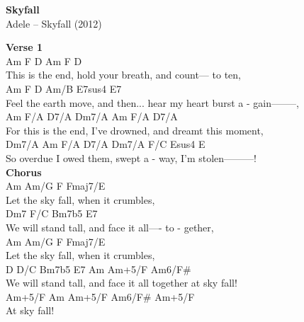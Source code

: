 \documentclass[a4paper]{article}
\begin{document}
    \begin{center}
        \textbf{Skyfall}
        ~\\
        Adele -- Skyfall (2012)
    \end{center}
    {
        \scriptsize
        \textbf{Verse 1}
        ~\\
        {
            \cutive
            \obeyspaces
     Am           F   D                         Am   F          D
\\
This is the end,         hold your breath, and count--- to ten,
\\
                Am        F     D                Am/B     E7sus4   E7
\\
Feel the earth move, and then...   hear my heart burst a - gain--------,
\\
         Am         F/A   D7/A        Dm7/A                    Am   F/A   D7/A
\\
For this is the end,            I've drowned, and dreamt this moment,
\\
    Dm7/A     Am  F/A   D7/A  Dm7/A      F/C       Esus4    E    
\\
So overdue I owed them,        swept a - way, I'm stolen---------!
\\

        }
        \textbf{Chorus}
        ~\\
        {
            \cutive
            \obeyspaces
         Am       Am/G       F      Fmaj7/E        
\\
Let the sky fall, when it crumbles,           
\\
         Dm7             F/C    Bm7b5          E7
\\
We will stand tall, and face it all---- to - gether,
\\
        Am        Am/G       F       Fmaj7/E        
\\
Let the sky fall, when it crumbles,           
\\
          D             D/C    Bm7b5         E7      Am    Am+5/F   Am6/F\#
\\
We will stand tall, and face it all together at sky fall!
\\
Am+5/F    Am    Am+5/F   Am6/F\#   Am+5/F
\\
  At sky fall!
\\

}}
\end{document}

